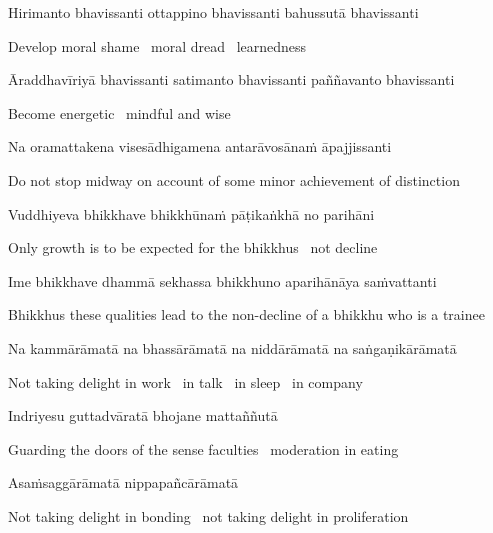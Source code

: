 Hirimanto bhavissanti ottappino bhavissanti bahussutā bhavissanti

\begin{cprenglish}
  Develop moral shame \breathmark\ moral dread \breathmark\ learnedness
\end{cprenglish}

Āraddhavīriyā bhavissanti satimanto bhavissanti paññavanto bhavissanti

\begin{cprenglish}
  Become energetic \breathmark\ mindful and wise
\end{cprenglish}

Na oramattakena visesādhigamena antarāvosānaṁ āpajjissanti

\begin{cprenglish}
  Do not stop midway on account of some minor achievement of distinction
\end{cprenglish}

Vuddhiyeva bhikkhave bhikkhūnaṁ pāṭikaṅkhā no parihāni

\begin{cprenglish}
  Only growth is to be expected for the bhikkhus \breathmark\ not decline
\end{cprenglish}

\suttaRef{[AN 7.23-27]}

Ime bhikkhave dhammā sekhassa bhikkhuno aparihānāya saṁvattanti

\begin{cprenglish}
  Bhikkhus these qualities lead to the non-decline of a bhikkhu who is a trainee
\end{cprenglish}

Na kammārāmatā na bhassārāmatā na niddārāmatā na saṅgaṇikārāmatā

\begin{cprenglish}
  Not taking delight in work \breathmark\ in talk \breathmark\ in sleep \breathmark\ in company
\end{cprenglish}

Indriyesu guttadvāratā bhojane mattaññutā

\begin{cprenglish}
  Guarding the doors of the sense faculties \breathmark\ moderation in eating
\end{cprenglish}

Asaṁsaggārāmatā nippapañcārāmatā

\begin{cprenglish}
  Not taking delight in bonding \breathmark\ not taking delight in proliferation
\end{cprenglish}

